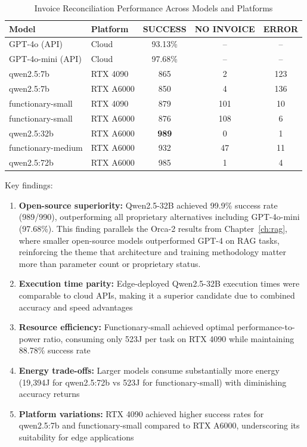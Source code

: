 \begin{table}[htbp]
\centering
\caption{Invoice Reconciliation Performance Across Models and Platforms}
\label{tab:invoice_results}
\begin{tabular}{@{}llccc@{}}
\toprule
\textbf{Model} & \textbf{Platform} & \textbf{SUCCESS} & \textbf{NO INVOICE} & \textbf{ERROR} \\
\midrule
GPT-4o (API) & Cloud & 93.13\% & -- & -- \\
GPT-4o-mini (API) & Cloud & 97.68\% & -- & -- \\
qwen2.5:7b & RTX 4090 & 865 & 2 & 123 \\
qwen2.5:7b & RTX A6000 & 850 & 4 & 136 \\
functionary-small & RTX 4090 & 879 & 101 & 10 \\
functionary-small & RTX A6000 & 876 & 108 & 6 \\
qwen2.5:32b & RTX A6000 & \textbf{989} & 0 & 1 \\
functionary-medium & RTX A6000 & 932 & 47 & 11 \\
qwen2.5:72b & RTX A6000 & 985 & 1 & 4 \\
\bottomrule
\end{tabular}
\end{table}

Key findings:

\begin{enumerate}[leftmargin=*]
    \item \textbf{Open-source superiority:} Qwen2.5-32B achieved 99.9\% success rate (989/990), outperforming all proprietary alternatives including GPT-4o-mini (97.68\%). This finding parallels the Orca-2 results from Chapter~\ref{ch:rag}, where smaller open-source models outperformed GPT-4 on RAG tasks, reinforcing the theme that architecture and training methodology matter more than parameter count or proprietary status.
    
    \item \textbf{Execution time parity:} Edge-deployed Qwen2.5-32B execution times were comparable to cloud APIs, making it a superior candidate due to combined accuracy and speed advantages
    
    \item \textbf{Resource efficiency:} Functionary-small achieved optimal performance-to-power ratio, consuming only 523J per task on RTX 4090 while maintaining 88.78\% success rate
    
    \item \textbf{Energy trade-offs:} Larger models consume substantially more energy (19,394J for qwen2.5:72b vs 523J for functionary-small) with diminishing accuracy returns
    
    \item \textbf{Platform variations:} RTX 4090 achieved higher success rates for qwen2.5:7b and functionary-small compared to RTX A6000, underscoring its suitability for edge applications
\end{enumerate}

